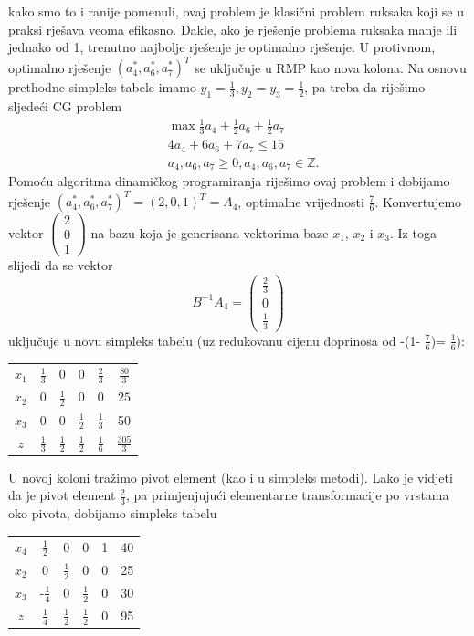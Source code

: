 \documentclass[a4paper, utf8, 11pt, colorlinks]{book}
\theoremstyle{definition}
\begin{document}
kako smo to i ranije pomenuli, ovaj problem je klasični problem ruksaka koji se u praksi rješava veoma efikasno. Dakle, ako je rješenje problema ruksaka manje ili jednako od 1, trenutno najbolje rješenje je optimalno rješenje. U protivnom, optimalno rješenje $(a_4^*, a_6^*, a_7^*)^T$ se uključuje  u RMP kao nova kolona. Na osnovu prethodne simpleks tabele imamo $y_1 = \frac{1}{3}, y_2 = y_3 = \frac{1}{2}$, pa treba da riješimo sljedeći CG problem
\begin{align*}
      &\max \frac{1}{3} a_4 + \frac{1}{2} a_6 + \frac{1}{2} a_7 \\
      & 4 a_4 + 6 a_6 + 7 a_7 \leq 15 \\
      & 	a_4, a_6, a_7 \geq 0, a_4, a_6, a_7 \in \mathbb{Z}.
\end{align*}
Pomoću algoritma dinamičkog programiranja riješimo ovaj problem i dobijamo rješenje 
$(a_4^*, a_6^*, a_7^*)^T =  (2, 0, 1)^T=A_4$, optimalne vrijednosti $\frac{7}{6}$. Konvertujemo vektor $\begin{pmatrix}
	2\\
    0 \\
    1
\end{pmatrix}$
na bazu koja je generisana vektorima baze $x_1$, $x_2$ i $x_3$.  Iz toga slijedi da se vektor 
$$ B^{-1}A_4 = \begin{pmatrix}
	  \frac{2}{3} \\
	  0           \\
	  \frac{1}{3}
\end{pmatrix}$$ uključuje u novu simpleks tabelu (uz redukovanu cijenu doprinosa od -(1- $\frac{7}{6}$)= $\frac{1}{6}$):

\begin{center}
	
	\begin{tabular}{ccccc|c}
		$x_1$ &     $\frac{1}{3}$  &   0 & 0  &      $ \frac{2}{3}$           & $\frac{80}{3}$ \\
		$x_2$ &     0              &  $\frac{1}{2}$  & 0     & 0                 &     $25$ \\
		$x_3$ &     0              &  0    &  $\frac{1}{2}$  & $ \frac{1}{3}$    & 50 \\ \hline
		$z$   &  $\frac{1}{3}$     &  $\frac{1}{2}$   &  $\frac{1}{2}$ &   $\frac{1}{6}$   & $\frac{305}{3}$ 
	\end{tabular}
\end{center}
U novoj koloni tražimo pivot element (kao i u simpleks metodi). Lako je vidjeti da je pivot element $\frac{2}{3}$, pa primjenjujući elementarne transformacije po vrstama oko pivota, dobijamo simpleks tabelu
\begin{center}
	\begin{tabular}{ccccc| c}
		  $x_4$ & $\frac{1}{2}$ & 0 & 0 & 1 & 40 \\
		  $x_2$ & 0 & $\frac{1}{2}$ & 0 & 0 & 25 \\
		  $x_3$ & -$\frac{1}{4}$ & 0 & $\frac{1}{2}$ & 0 & 30 \\ \hline
		  $z$ & $\frac{1}{4}$ & $\frac{1}{2}$ & $\frac{1}{2}$ & 0 & 95 
	\end{tabular}
\end{center}
\end{document}
